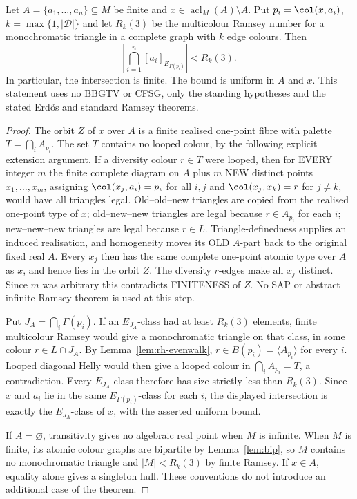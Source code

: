 \begin{theorem}
\label{thm:rh-hull}
Let $A=\{a_1,\dots,a_n\}\subseteq M$ be finite and
$x\in\operatorname{acl}_M(A)\setminus A$. Put
$p_i=\col(x,a_i)$, $k=\max\{1,|\mathcal D|\}$ and let
$R_k(3)$ be the multicolour Ramsey number for a monochromatic
triangle in a complete graph with $k$ edge colours. Then
\[
 \left|\bigcap_{i=1}^n[a_i]_{E_{\Gamma(p_i)}}\right|<R_k(3).
\]
In particular, the intersection is finite. The bound is uniform
in $A$ and $x$. This statement uses no BBGTV or CFSG, only the
standing hypotheses and the stated Erd\H{o}s and standard Ramsey
theorems.
\end{theorem}
\begin{proof}
The orbit $Z$ of $x$ over $A$ is a finite realised one-point fibre
with palette $T=\bigcap_iA_{p_i}$. The set $T$ contains no looped
colour, by the following explicit extension argument.
If a diversity colour \(r\in T\) were looped,
then for EVERY integer \(m\) the finite
complete diagram on \(A\) plus \(m\) NEW
distinct points \(x_1,\ldots,x_m\), assigning
\(\col(x_j,a_i)=p_i\) for all \(i,j\)
and \(\col(x_j,x_k)=r\) for \(j\ne k\),
would have all triangles legal.
Old--old--new triangles are copied
from the realised one-point type of \(x\);
old--new--new triangles are legal because
\(r\in A_{p_i}\) for each \(i\);
new--new--new triangles are legal because
\(r\in L\). Triangle-definedness supplies
an induced realisation, and homogeneity
moves its OLD \(A\)-part back to the
original fixed real \(A\).
Every \(x_j\) then has the same complete
one-point atomic type over \(A\) as \(x\),
and hence lies in the orbit \(Z\).
The diversity \(r\)-edges make all
\(x_j\) distinct. Since \(m\) was
arbitrary this contradicts FINITENESS
of \(Z\). No SAP or abstract infinite
Ramsey theorem is used at this step.

Put $J_A=\bigcap_i\Gamma(p_i)$. If an $E_{J_A}$-class had at
least $R_k(3)$ elements, finite multicolour Ramsey would give a
monochromatic triangle on that class, in some colour
$r\in L\cap J_A$. By Lemma~\ref{lem:rh-evenwalk},
$r\in B(p_i)=\langle A_{p_i}\rangle$ for every $i$. Looped
diagonal Helly would then give a looped colour in
$\bigcap_i A_{p_i}=T$, a contradiction. Every $E_{J_A}$-class
therefore has size strictly less than $R_k(3)$. Since $x$ and
$a_i$ lie in the same $E_{\Gamma(p_i)}$-class for each $i$,
the displayed intersection is exactly the $E_{J_A}$-class of
$x$, with the asserted uniform bound.

If $A=\varnothing$, transitivity gives no algebraic real point
when $M$ is infinite. When $M$ is finite, its atomic colour graphs
are bipartite by Lemma~\ref{lem:bip}, so $M$ contains no
monochromatic triangle and $|M|<R_k(3)$ by finite Ramsey.
If $x\in A$, equality alone gives a singleton hull. These conventions
do not introduce an additional case of the theorem.
\end{proof}


